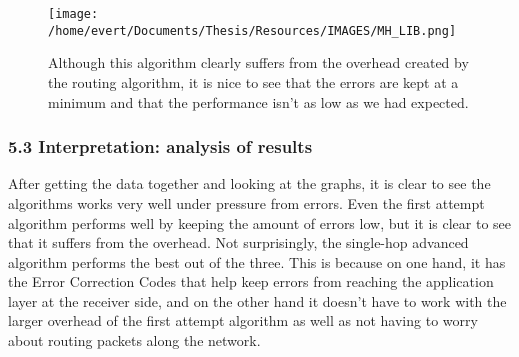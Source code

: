 \begin{figure}[htbp]
\centering
\texttt{[image: /home/evert/Documents/Thesis/Resources/IMAGES/MH\_LIB.png]}
\caption{Although this algorithm clearly suffers from the overhead
created by the routing algorithm, it is nice to see that the errors are
kept at a minimum and that the performance isn't as low as we had
expected.}
\end{figure}

\subsubsection{5.3 Interpretation: analysis of
results}\label{interpretation-analysis-of-results}

After getting the data together and looking at the graphs, it is clear
to see the algorithms works very well under pressure from errors. Even
the first attempt algorithm performs well by keeping the amount of
errors low, but it is clear to see that it suffers from the overhead.
Not surprisingly, the single-hop advanced algorithm performs the best
out of the three. This is because on one hand, it has the Error
Correction Codes that help keep errors from reaching the application
layer at the receiver side, and on the other hand it doesn't have to
work with the larger overhead of the first attempt algorithm as well as
not having to worry about routing packets along the network.
